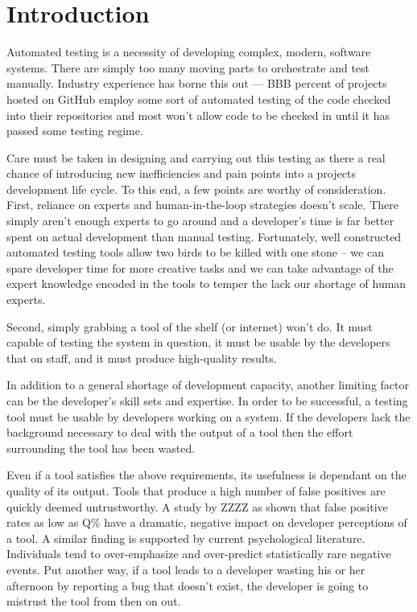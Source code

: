 \section{Introduction}
\label{SEC:introduction}


Automated testing is a necessity of developing complex, modern, software
systems.  There are simply too many moving parts to orchestrate and test
manually.  Industry experience has borne this out --- BBB percent of
projects hosted on GitHub employ some sort of automated testing of the code
checked into their repositories and most won't allow code to be checked in
until it has passed some testing regime.

Care must be taken in designing and carrying out this testing as there a
real chance of introducing new inefficiencies and pain points into a
projects development life cycle.  To this end, a few points are worthy of
consideration. First, reliance on experts and human-in-the-loop strategies
doesn't scale.  There simply aren't enough experts to
go around and a developer's time is far better spent on actual development
than manual testing.  Fortunately, well
constructed automated testing tools allow two birds to be killed with one
stone -- we can spare developer time for more creative tasks and we can
take advantage of the expert knowledge encoded in the tools to temper the
lack our shortage of human experts.


Second, simply grabbing a tool of the shelf (or internet) won't do.  It
must capable of testing the system in question, it must be usable by the
developers that on staff, and it must produce high-quality results.

In addition to a general shortage of development capacity, another limiting
factor can be the developer's skill sets and expertise.  In order to be
successful, a testing tool must be usable by developers working on a
system.  If the developers lack the background necessary to deal with the
output of a tool then the effort surrounding the tool has been wasted.

Even if a tool satisfies the above requirements, its usefulness is
dependant on the quality of its output.  Tools that produce a high number
of false positives are quickly deemed untrustworthy.  A study by ZZZZ as
shown that false positive rates as low as Q\% have a dramatic, negative
impact on developer perceptions of a tool.    A similar
finding is supported by current psychological literature.  Individuals tend
to over-emphasize and over-predict statistically rare negative
events.  Put another way, if a tool leads to a developer
wasting his or her afternoon by reporting a bug that doesn't exist, the
developer is going to mistrust the tool from then on out.

